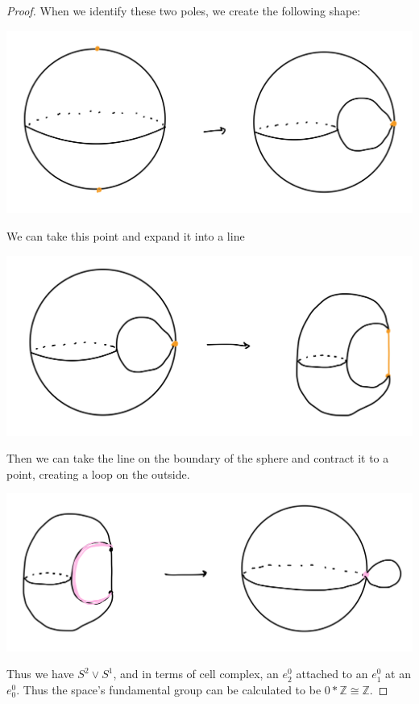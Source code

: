 \documentclass[12pt]{article}
\begin{document}
\begin{proof}
  When we identify these two poles, we create the following shape:
  \par \begin{center} \includegraphics[scale=.2]{3-1.jpg} \end{center}
  \par We can take this point and expand it into a line
  \par \begin{center} \includegraphics[scale=.2]{3-2.jpg} \end{center}
  \par Then we can take the line on the boundary of the sphere and contract it to a point, creating a loop on the outside.
  \par \begin{center} \includegraphics[scale=.2]{3-3.jpg} \end{center}
  \par Thus we have $S^2 \vee S^1$, and in terms of cell complex, an $e^0_2$ attached to an $e_1^0$ at an $e_0^0$.
  Thus the space's fundamental group can be calculated to be $0 \ast \mathbb{Z} \cong \mathbb{Z}$.
\end{proof}
\end{document}
